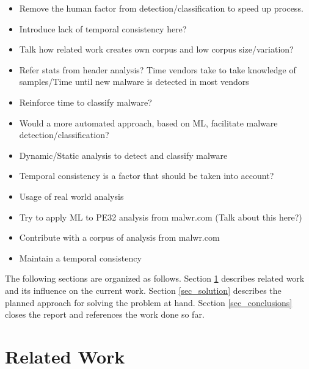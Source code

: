 \documentclass{llncs}
\begin{document}



\begin{itemize}
	\item Remove the human factor from detection/classification to speed up process.
	\item Introduce lack of temporal consistency here?
	\item Talk how related work creates own corpus and low corpus size/variation?
	\item Refer stats from header analysis? Time vendors take to take knowledge of samples/Time until new malware is detected in most vendors
	\item Reinforce time to classify malware?
\end{itemize}

\begin{itemize}
	\item Would a more automated approach, based on ML, facilitate malware detection/classification?
	\item Dynamic/Static analysis to detect and classify malware
	\item Temporal consistency is a factor that should be taken into account?
	
\end{itemize}
\begin{itemize}
	\item Usage of real world analysis
	\item Try to apply ML to PE32 analysis from malwr.com (Talk about this here?)
	\item Contribute with a corpus of analysis from malwr.com
	\item Maintain a temporal consistency
		
	
\end{itemize}
The following sections are organized as follows. Section \ref{sec_related_work} describes related work and its influence on the current work. Section \ref{sec_solution} describes the planned approach for solving the problem at hand. Section \ref{sec_conclusions} closes the report and references the work done so far.


\section{Related Work}\label{sec_related_work}
\end{document}
